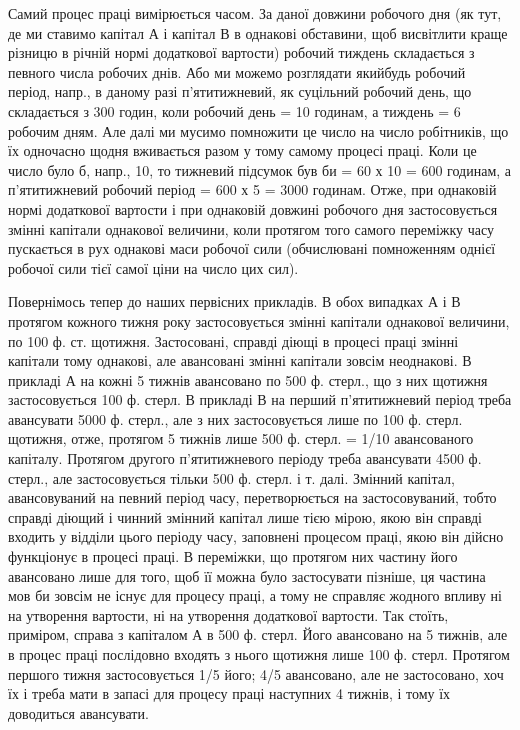 Самий процес праці вимірюється часом. За даної довжини робочого
дня (як тут, де ми ставимо капітал А і капітал В в однакові обставини,
щоб висвітлити краще різницю в річній нормі додаткової вартости)
робочий тиждень складається з певного числа робочих днів. Або ми
можемо розглядати якийбудь робочий період, напр., в даному разі п’ятитижневий,
як суцільний робочий день, що складається з 300 годин, коли
робочий день = 10 годинам, а тиждень = 6 робочим дням. Але далі ми
мусимо помножити це число на число робітників, що їх одночасно щодня
вживається разом у тому самому процесі праці. Коли це число
було б, напр., 10, то тижневий підсумок був би = 60 х 10 = 600 годинам,
а п’ятитижневий робочий період = 600 х 5 = 3000 годинам. Отже,
при однаковій нормі додаткової вартости і при однаковій довжині робочого
дня застосовується змінні капітали однакової величини, коли протягом
того самого переміжку часу пускається в рух однакові маси робочої
сили (обчислювані помноженням однієї робочої сили тієї самої
ціни на число цих сил).

Повернімось тепер до наших первісних прикладів. В обох випадках
А і В протягом кожного тижня року застосовується змінні капітали
однакової величини, по 100 ф. ст. щотижня. Застосовані, справді діющі
в процесі праці змінні капітали тому однакові, але авансовані змінні
капітали зовсім неоднакові. В прикладі А на кожні 5 тижнів авансовано по
500 ф. стерл., що з них щотижня застосовується 100 ф. стерл. В прикладі
В на перший п’ятитижневий період треба авансувати 5000 ф. стерл., але
з них застосовується лише по 100 ф. стерл. щотижня, отже, протягом
5 тижнів лише 500 ф. стерл. = 1/10 авансованого капіталу. Протягом
другого п’ятитижневого періоду треба авансувати 4500 ф. стерл., але застосовується
тільки 500 ф. стерл. і т. далі. Змінний капітал, авансовуваний
на певний період часу, перетворюється на застосовуваний, тобто справді
діющий і чинний змінний капітал лише тією мірою, якою він справді входить
у відділи цього періоду часу, заповнені процесом праці, якою він
дійсно функціонує в процесі праці. В переміжки, що протягом них
частину його авансовано лише для того, щоб її можна було застосувати
пізніше, ця частина мов би зовсім не існує для процесу праці, а тому
не справляє жодного впливу ні на утворення вартости, ні на утворення
додаткової вартости. Так стоїть, приміром, справа з капіталом А в
500 ф. стерл. Його авансовано на 5 тижнів, але в процес праці послідовно
входять з нього щотижня лише 100 ф. стерл. Протягом першого тижня
застосовується 1/5 його; 4/5 авансовано, але не застосовано, хоч їх і
треба мати в запасі для процесу праці наступних 4 тижнів, і тому їх
доводиться авансувати.

